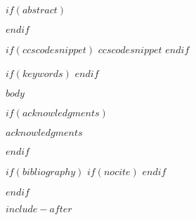 \documentclass[$acmstyle$$if(fontsize)$,$fontsize$$endif$$if(review)$,review$endif$$if(anonymous)$,anonymous$endif$$if(screen)$,screen$endif$]{acmart}
\begin{document}
$if(abstract)$
\begin{abstract}
$abstract$
\end{abstract}
$endif$


$if(ccscodesnippet)$
$ccscodesnippet$
$endif$



$if(keywords)$
$endif$  %


\maketitle

$body$

$if(acknowledgments)$
\begin{acks}                            %
$acknowledgments$
\end{acks}
$endif$

$if(bibliography)$
$if(nocite)$
\nocite{*}
$endif$

$endif$

$include-after$
\end{document}
